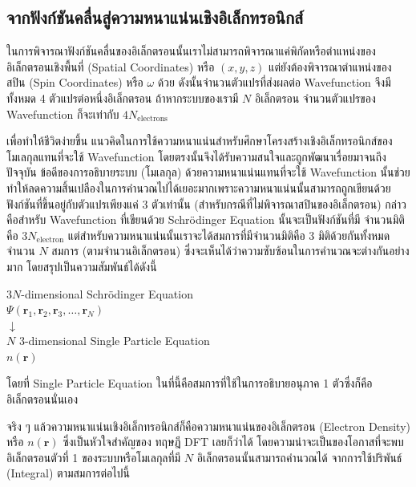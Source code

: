 \subsection{จากฟังก์ชันคลื่นสู่ความหนาแน่นเชิงอิเล็กทรอนิกส์}
\label{ssec:elec_density}

ในการพิจารณาฟังก์ชันคลื่นของอิเล็กตรอนนั้นเราไม่สามารถพิจารณาแค่พิกัดหรือตำแหน่งของอิเล็กตรอนเชิงพื้นที่ (Spatial Coordinates) หรือ
$(x, y, z)$ แต่ยังต้องพิจารณาตำแหน่งของสปิน (Spin Coordinates) หรือ $\omega$ ด้วย ดังนั้นจำนวนตัวแปรที่ส่งผลต่อ Wavefunction
จึงมีทั้งหมด 4 ตัวแปรต่อหนึ่งอิเล็กตรอน ถ้าหากระบบของเรามี $N$ อิเล็กตรอน จำนวนตัวแปรของ Wavefunction ก็จะเท่ากับ
$4 N_{\text{electrons}}$

เพื่อทำให้ชีวิตง่ายขึ้น แนวคิดในการใช้ความหนาแน่นสำหรับศึกษาโครงสร้างเชิงอิเล็กทรอนิกส์ของโมเลกุลแทนที่จะใช้ Wavefunction
โดยตรงนั้นจึงได้รับความสนใจและถูกพัฒนาเรื่อยมาจนถึงปัจจุบัน ข้อดีของการอธิบายระบบ (โมเลกุล) ด้วยความหนาแน่นแทนที่จะใช้ Wavefunction
นั้นช่วยทำให้ลดความสิ้นเปลืองในการคำนวณไปได้เยอะมากเพราะความหนาแน่นนั้นสามารถถูกเขียนด้วยฟังก์ชันที่ขึ้นอยู่กับตัวแปรเพียงแค่ 3 ตัวเท่านั้น
(สำหรับกรณีที่ไม่พิจารณาสปินของอิเล็กตรอน) กล่าวคือสำหรับ Wavefunction ที่เขียนด้วย Schr\"{o}dinger Equation นั้นจะเป็นฟังก์ชันที่มี%
จำนวนมิติคือ $3N_{\text{electron}}$ แต่สำหรับความหนาแน่นนั้นเราจะได้สมการที่มีจำนวนมิติคือ 3 มิติด้วยกันทั้งหมดจำนวน $N$ สมการ
(ตามจำนวนอิเล็กตรอน) ซึ่งจะเห็นได้ว่าความซับซ้อนในการคำนวณจะต่างกันอย่างมาก โดยสรุปเป็นความสัมพันธ์ได้ดังนี้

\begin{framed}
    \centering
    $3N$-dimensional Schr\"{o}dinger Equation \\
    $\Psi(\bm{r}_{1}, \bm{r}_{2}, \bm{r}_{3}, \dots, \bm{r}_{N})$ \\
    $\downarrow$ \\
    $N$ $3$-dimensional Single Particle Equation \\
    $n({\bm{r}})$
\end{framed}

\noindent โดยที่ Single Particle Equation ในที่นี้คือสมการที่ใช้ในการอธิบายอนุภาค 1 ตัวซึ่งก็คืออิเล็กตรอนนั่นเอง

จริง ๆ แล้วความหนาแน่นเชิงอิเล็กทรอนิกส์ก็คือความหนาแน่นของอิเล็กตรอน (Electron Density) หรือ $n(\bm{r})$ ซึ่งเป็นหัวใจสำคัญของ%
ทฤษฎี DFT เลยก็ว่าได้ โดยความน่าจะเป็นของโอกาสที่จะพบอิเล็กตรอนตัวที่ 1 ของระบบหรือโมเลกุลที่มี $N$ อิเล็กตรอนนั้นสามารถคำนวณได้%
จากการใช้ปริพันธ์ (Integral) ตามสมการต่อไปนี้

